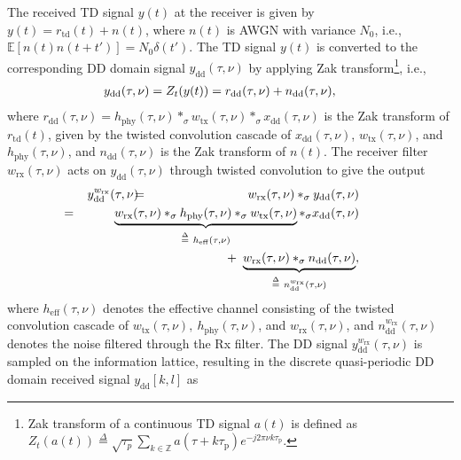 The received TD signal $y(t)$ at the receiver is given by $y(t)=r_{\mathrm{td}}(t)+n(t)$,
where $n(t)$ is AWGN with variance $N_{0}$, i.e., $\mathbb{E}[n(t)n(t+t')]=N_{0}\delta(t')$. The TD signal $y(t)$ is converted to the corresponding DD domain signal $y_{\mathrm{dd}}(\tau,\nu)$ by applying Zak transform\footnote{Zak transform of a continuous TD signal $a(t)$ is defined as
$Z_t\left(a(t)\right) \overset{\Delta}{=} \sqrt{\tau_p} \sum_{k \in \mathbb{Z}} a(\tau + k \tau_{\mathrm p}) e^{-j2\pi\nu k\tau_{\mathrm p}}$.}, i.e.,
\begin{eqnarray}
\hspace{-6mm}
y_{\mathrm{dd}}(\tau,\nu) = Z_{t}(y(t)) 
= r_{\mathrm{dd}}(\tau,\nu)+n_{\mathrm{dd}}(\tau,\nu),
\end{eqnarray}
where $r_{\mathrm{dd}}(\tau,\nu)=h_{\mathrm{phy}}(\tau,\nu)*_{\sigma}w_{\mathrm{tx}}(\tau,\nu)*_{\sigma}x_{\mathrm{dd}}(\tau,\nu)$ is the Zak transform of $r_{\mathrm{td}}(t)$, given by the twisted convolution cascade of $x_{\mathrm{dd}}(\tau,\nu)$, $w_{\mathrm{tx}}(\tau,\nu)$, and $h_{\mathrm{phy}}(\tau,\nu)$,  and $n_{\mathrm{dd}}(\tau,\nu)$ is the Zak transform of $n(t)$. The receiver filter $w_{\mathrm{rx}}(\tau,\nu)$ acts on $y_{\mathrm{dd}}(\tau,\nu)$ through twisted convolution to give the output 
\begin{eqnarray}
\hspace{-4mm} 
y_{\mathrm{dd}}^{w_{\mathrm{rx}}}(\tau,\nu) & \hspace{-2mm} = & \hspace{-2mm} w_{\mathrm{rx}}(\tau,\nu)*_{\sigma}y_{\mathrm{dd}}(\tau,\nu) \nonumber \\ 
& \hspace{-22mm} = & \hspace{-12mm} \underbrace{w_{\mathrm{rx}}(\tau,\nu)*_{\sigma}h_{\mathrm{phy}}(\tau,\nu)*_{\sigma}w_{\mathrm{tx}}(\tau,\nu)}_{\overset{\Delta}{=} \ h_{\mathrm{eff}}(\tau,\nu)}*_{\sigma}x_{\mathrm{dd}}(\tau,\nu) \nonumber \\ 
&\hspace{-22mm} & \hspace{-12mm} + \ \underbrace{w_{\mathrm{rx}}(\tau,\nu)*_{\sigma}n_{\mathrm{dd}}(\tau,\nu)}_{\overset{\Delta}{=} \ n_{\mathrm{dd}}^{w_{\mathrm{rx}}}(\tau,\nu)}, 
\label{cont1}
\end{eqnarray}
where $h_{\mathrm{eff}}(\tau,\nu)$ denotes the effective channel consisting of the twisted convolution cascade of $w_{\mathrm{tx}}(\tau,\nu),\ h_{\mathrm{phy}}(\tau,\nu)$, and $w_{\mathrm{rx}}(\tau,\nu)$, and $n_{\mathrm{dd}}^{w_{\mathrm{rx}}}(\tau,\nu)$ denotes the noise filtered through the Rx filter. The DD signal $y_{\mathrm{dd}}^{w_{\mathrm{rx}}}(\tau,\nu)$ is sampled on the information lattice, resulting in the discrete quasi-periodic DD domain received signal $y_{\mathrm{dd}}[k,l]$ as
